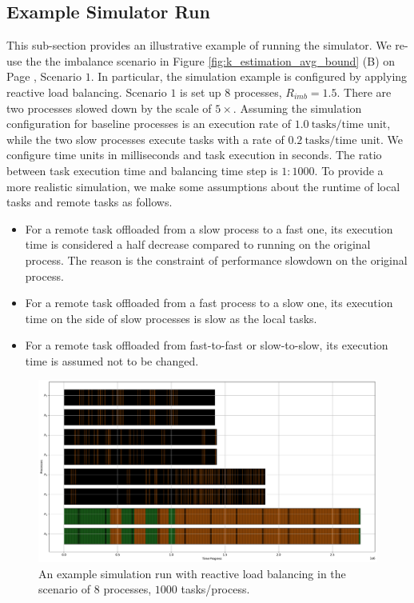 \subsection{Example Simulator Run}
\label{subsec:Simulator-Run-Example}

This sub-section provides an illustrative example of running the simulator. We re-use the the imbalance scenario in Figure \ref{fig:k_estimation_avg_bound} (B) on Page \pageref{fig:k_estimation_avg_bound}, Scenario $1$. In particular, the simulation example is configured by applying reactive load balancing. Scenario $1$ is set up $8$ processes, $R_{imb} = 1.5$. There are two processes slowed down by the scale of $5 \times$. Assuming the simulation configuration for baseline processes is an execution rate of $1.0\ \text{tasks/time unit}$, while the two slow processes execute tasks with a rate of $0.2\ \text{tasks/time unit}$. We configure time units in milliseconds and task execution in seconds. The ratio between task execution time and balancing time step is $1:1000$. To provide a more realistic simulation, we make some assumptions about the runtime of local tasks and remote tasks as follows.
\begin{itemize}
	\item For a remote task offloaded from a slow process to a fast one, its execution time is considered a half decrease compared to running on the original process. The reason is the constraint of performance slowdown on the original process.
	\item For a remote task offloaded from a fast process to a slow one, its execution time on the side of slow processes is slow as the local tasks.
	\item For a remote task offloaded from fast-to-fast or slow-to-slow, its execution time is assumed not to be changed.
\end{itemize}

\begin{figure}[t]
  \centering
  \includegraphics[scale=0.36]{./pictures/perf_analysis_model/perf_model_simulate_react_lb_1000_tasks_per_rank.pdf}
	\caption{An example simulation run with reactive load balancing in the scenario of $8$ processes, $1000$ tasks/process.}
	\label{fig:react_lb_simulation_1000_tasks_per_rank_example}
\end{figure}

